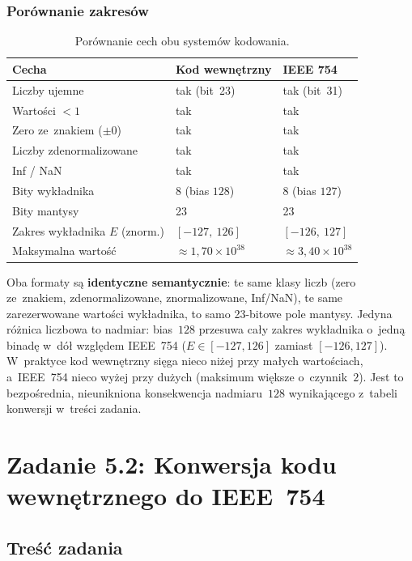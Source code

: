 \documentclass[12pt,a4paper]{article}
\begin{document}
\subsubsection*{Porównanie zakresów}

\begin{table}[H]
\centering
\begin{tabular}{lll}
\toprule
\textbf{Cecha} & \textbf{Kod wewnętrzny} & \textbf{IEEE 754} \\
\midrule
Liczby ujemne   & tak (bit~23) & tak (bit~31) \\
Wartości $< 1$  & tak & tak \\
Zero ze~znakiem ($\pm0$) & tak & tak \\
Liczby zdenormalizowane & tak & tak \\
Inf / NaN & tak & tak \\
Bity wykładnika & 8 (bias $128$) & 8 (bias $127$) \\
Bity mantysy    & 23 & 23 \\
Zakres wykładnika $E$ (znorm.) & $[-127,\ 126]$ & $[-126,\ 127]$ \\
Maksymalna wartość & $\approx 1{,}70 \times 10^{38}$ & $\approx 3{,}40 \times 10^{38}$ \\
\bottomrule
\end{tabular}
\caption{Porównanie cech obu systemów kodowania.}
\end{table}

Oba formaty są \textbf{identyczne semantycznie}: te same klasy liczb (zero ze~znakiem,
zdenormalizowane, znormalizowane, Inf/NaN), te same zarezerwowane wartości
wykładnika, to samo 23-bitowe pole mantysy. Jedyna różnica liczbowa to nadmiar:
bias~$128$ przesuwa cały zakres wykładnika o~jedną binadę w~dół względem IEEE~754
($E \in [-127, 126]$ zamiast $[-126, 127]$). W~praktyce kod wewnętrzny sięga
nieco niżej przy małych wartościach, a~IEEE~754 nieco wyżej przy dużych
(maksimum większe o~czynnik~$2$). Jest to bezpośrednia, nieunikniona konsekwencja
nadmiaru~$128$ wynikającego z~tabeli konwersji w~treści zadania.

\section*{Zadanie 5.2: Konwersja kodu wewnętrznego do IEEE~754}

\subsection*{Treść zadania}
\end{document}
